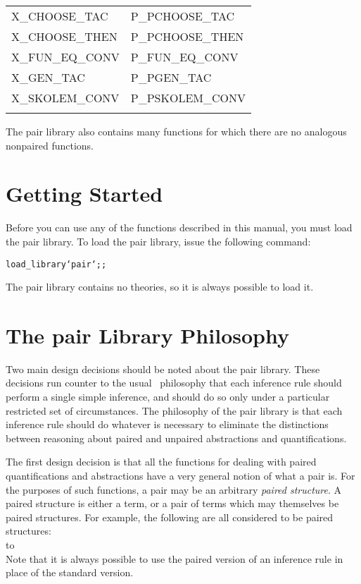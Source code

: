 {\begin{center}
\begin{tabular}[t]{|l|l|}
        X\_CHOOSE\_TAC              &   P\_PCHOOSE\_TAC             \\
        X\_CHOOSE\_THEN             &   P\_PCHOOSE\_THEN            \\
        X\_FUN\_EQ\_CONV            &   P\_FUN\_EQ\_CONV            \\
        X\_GEN\_TAC                 &   P\_PGEN\_TAC                \\
        X\_SKOLEM\_CONV             &   P\_PSKOLEM\_CONV            \\  
                                    &                               \\  \hline
    \end{tabular}
\end{center} }
The pair library also contains many functions for which there are no
analogous nonpaired functions.

\section{Getting Started}

Before you can use any of the functions described in this manual,
you must load the pair library.
To load the pair library, issue the following command:
\begin{hol}\begin{alltt}
    load_library `pair`;;
\end{alltt}\end{hol}
The pair library contains no theories, so it is always possible to load it.

\section{The pair Library Philosophy}

Two main design decisions should be noted about the pair library.
These decisions run counter to the usual \HOL\ philosophy that each
inference rule should perform a single simple inference,
and should do so only under a particular restricted set of circumstances.
The philosophy of the pair library is that each 
inference rule should do whatever is necessary to eliminate the distinctions
between reasoning about paired and unpaired abstractions and quantifications.

The first design decision is that all the functions for dealing with paired
quantifications and abstractions have a very general notion of what a pair is.
For the purposes of such functions, a pair may be an arbitrary
{\it paired structure}.
A paired structure is either a term,
or a pair of terms which may themselves be paired structures.
For example, the following are all considered to be paired structures:  \\
\noindent
\hbox to \textwidth{\tt
    \hfil
    a
    \hfil
    (a,b)
    \hfil
    (a,b,c)
    \hfil
    ((a1,a2),(b1,b2))
    \hfil
    ((a1,a2),(b2,b2),(c1,c2))
    \hfil
}\\
\noindent
Note that it is always possible to use the paired version
of an inference rule in place of the standard version.

